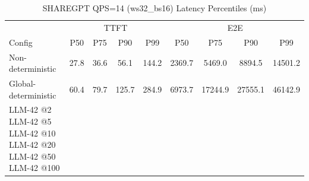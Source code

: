 \begin{table}[htbp]
\centering
\caption{SHAREGPT QPS=14 (ws32_bs16) Latency Percentiles (ms)}
\label{tab:sharegpt_qps14_ws32_bs16}
\begin{tabular}{l|cccc|cccc}
\toprule
& \multicolumn{4}{c|}{TTFT} & \multicolumn{4}{c}{E2E} \\
Config & P50 & P75 & P90 & P99 & P50 & P75 & P90 & P99 \\
\midrule
Non-deterministic & 27.8 & 36.6 & 56.1 & 144.2 & 2369.7 & 5469.0 & 8894.5 & 14501.2 \\
Global-deterministic & 60.4 & 79.7 & 125.7 & 284.9 & 6973.7 & 17244.9 & 27555.1 & 46142.9 \\
LLM-42 @2%
LLM-42 @5%
LLM-42 @10%
LLM-42 @20%
LLM-42 @50%
LLM-42 @100%
\bottomrule
\end{tabular}
\end{table}
